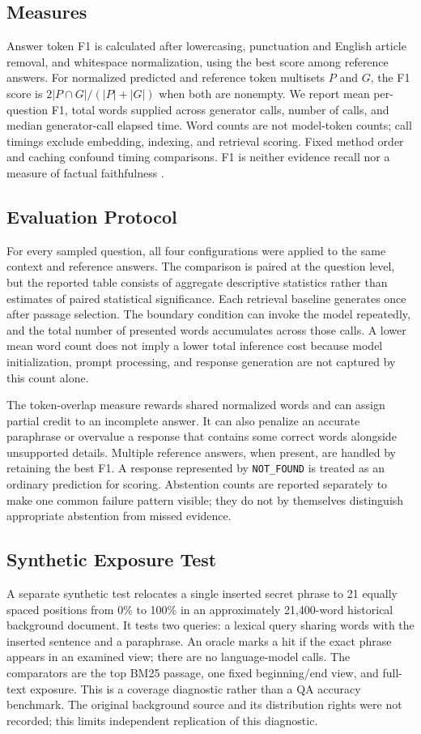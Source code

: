 \documentclass[conference]{IEEEtran}
\begin{document}
\subsection{Measures}
Answer token F1 is calculated after lowercasing, punctuation and English article removal, and whitespace normalization, using the best score among reference answers. For normalized predicted and reference token multisets $P$ and $G$, the F1 score is $2|P\cap G|/(|P|+|G|)$ when both are nonempty. We report mean per-question F1, total words supplied across generator calls, number of calls, and median generator-call elapsed time. Word counts are not model-token counts; call timings exclude embedding, indexing, and retrieval scoring. Fixed method order and caching confound timing comparisons. F1 is neither evidence recall nor a measure of factual faithfulness \cite{ragas,ares}.

\subsection{Evaluation Protocol}
For every sampled question, all four configurations were applied to the same context and reference answers. The comparison is paired at the question level, but the reported table consists of aggregate descriptive statistics rather than estimates of paired statistical significance. Each retrieval baseline generates once after passage selection. The boundary condition can invoke the model repeatedly, and the total number of presented words accumulates across those calls. A lower mean word count does not imply a lower total inference cost because model initialization, prompt processing, and response generation are not captured by this count alone.

The token-overlap measure rewards shared normalized words and can assign partial credit to an incomplete answer. It can also penalize an accurate paraphrase or overvalue a response that contains some correct words alongside unsupported details. Multiple reference answers, when present, are handled by retaining the best F1. A response represented by \texttt{NOT\_FOUND} is treated as an ordinary prediction for scoring. Abstention counts are reported separately to make one common failure pattern visible; they do not by themselves distinguish appropriate abstention from missed evidence.

\subsection{Synthetic Exposure Test}
A separate synthetic test relocates a single inserted secret phrase to 21 equally spaced positions from 0\% to 100\% in an approximately 21,400-word historical background document. It tests two queries: a lexical query sharing words with the inserted sentence and a paraphrase. An oracle marks a hit if the exact phrase appears in an examined view; there are no language-model calls. The comparators are the top BM25 passage, one fixed beginning/end view, and full-text exposure. This is a coverage diagnostic rather than a QA accuracy benchmark. The original background source and its distribution rights were not recorded; this limits independent replication of this diagnostic.
\end{document}
